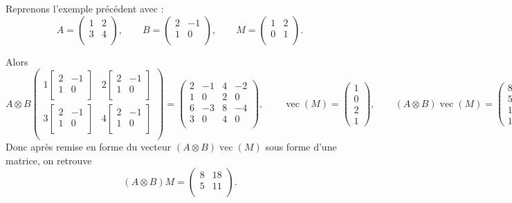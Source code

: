 \documentclass[11pt,class=report,crop=false]{standalone}
\begin{document}
\begin{exemple}
Reprenons l'exemple précédent avec :
$$A = 
\begin{pmatrix}
	1 & 2 \\ 
	3 & 4 \\
\end{pmatrix},
\qquad
B = 
\begin{pmatrix}
	2 & -1 \\
	1 & 0 \\
\end{pmatrix},
\qquad
M = 
\begin{pmatrix}
	1 & 2 \\
	0 & 1 \\
\end{pmatrix}.
$$

Alors 
{\small
\[
A \otimes B
\begin{pmatrix}
	1\begin{bmatrix}	2 & -1 \\1 & 0 \\\end{bmatrix}   & 
	2\begin{bmatrix}	2 & -1 \\1 & 0 \\\end{bmatrix}   \\	 
	3\begin{bmatrix}	2 & -1 \\1 & 0 \\\end{bmatrix}   & 
    4\begin{bmatrix}	2 & -1 \\1 & 0 \\\end{bmatrix}   \\	 	
\end{pmatrix}
= 
\begin{pmatrix}
2 & -1 & 4 & -2 \\
1 &  0 & 2 & 0 \\
6 & -3 & 8 & -4 \\
3 & 0 & 4 & 0 \\	
\end{pmatrix},
\qquad 	
\operatorname{vec}(M) 
= \begin{pmatrix} 1 \\ 0 \\ 2 \\ 1 \end{pmatrix},
\qquad 
(A \otimes B) \operatorname{vec}(M) 
= \begin{pmatrix} 8 \\ 5 \\ 18 \\ 11 \end{pmatrix}.
\]
}
Donc après remise en forme du vecteur $(A \otimes B) \operatorname{vec}(M)$ sous forme d'une matrice, on retrouve 
$$
(A \otimes B) M = 
\begin{pmatrix}
	8 & 18 \\ 
	5 & 11 \\
\end{pmatrix}.
$$
\end{exemple}
\end{document}
